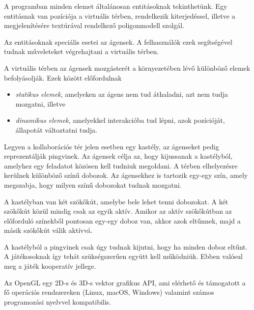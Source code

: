 


A programban minden elemet általánosan entitásoknak tekinthetünk.
Egy entitásnak van pozíciója a virtuális térben, rendelkezik kiterjedéssel, illetve a megjelenítésére textúrával rendelkező poligonmodell szolgál.


Az entitásoknak speciális esetei az ágensek.
A felhasználók ezek segítségével tudnak műveleteket végrehajtani a virtuális térben.


A virtuális térben az ágensek mozgásterét a környezetében lévő különböző elemek befolyásolják.
Ezek között előfordulnak
\begin{itemize}
\item \textit{statikus elemek}, amelyeken az ágens nem tud áthaladni, azt nem tudja mozgatni, illetve
\item \textit{dinamikus elemek}, amelyekkel interakcióba tud lépni, azok pozícióját, állapotát változtatni tudja.
\end{itemize}


Legyen a kollaborációs tér jelen esetben egy kastély, az ágenseket pedig reprezentálják pingvinek.
Az ágensek célja az, hogy kijussanak a kastélyból, amelyhez egy feladatot közösen kell tudniuk megoldani.
A térben elhelyezésre kerülnek különböző színű dobozok.
Az ágensekhez is tartozik egy-egy szín, amely megszabja, hogy milyen színű dobozokat tudnak mozgatni.

A kastélyban van két szökőkút, amelybe bele lehet tenni dobozokat.
A két szökőkút közül mindig csak az egyik aktív.
Amikor az aktív szökőkútban az előforduló színekből pontosan egy-egy doboz van, akkor azok eltűnnek, majd a másik szökőkút válik aktívvá.

A kastélyból a pingvinek csak úgy tudnak kijutni, hogy ha minden doboz eltűnt.
A játékosoknak így tehát szükségszerűen együtt kell működniük.
Ebben valósul meg a játék kooperatív jellege.



Az OpenGL egy 2D-s és 3D-s vektor grafikus  API, ami elérhető és támogatott a fő operációs rendszereken (Linux, macOS, Windows) valamint számos programozási nyelvvel kompatibilis.

